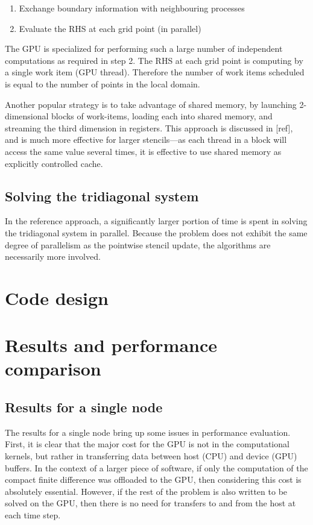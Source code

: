 \documentclass{article}
\begin{document}
        \begin{enumerate}
            \item Exchange boundary information with neighbouring processes
            \item Evaluate the RHS at each grid point (in parallel)
        \end{enumerate}

        The GPU is specialized for performing such a large number of independent
        computations as required in step 2.
        The RHS at each grid point is computing by a single work item
        (GPU thread).
        Therefore the number of work items scheduled is
        equal to the number of points in the local domain.

        Another popular strategy is to take advantage of
        shared memory, by launching 2-dimensional blocks of work-items,
        loading each into shared memory, and streaming the third dimension
        in registers.
        This approach is discussed in [ref], and is much more effective
        for larger stencils---as each thread in a block will access the same
        value several times, it is effective to use shared memory as explicitly
        controlled cache.

    \subsection{Solving the tridiagonal system}

        In the reference approach, a significantly larger portion of time is spent in solving
        the tridiagonal system in parallel.
        Because the problem does not exhibit the same degree of parallelism as
        the pointwise stencil update,
        the algorithms are necessarily more involved.

\section{Code design}

\section{Results and performance comparison}

    \subsection{Results for a single node}
    The results for a single node bring up some issues in performance evaluation.
    First, it is clear that the major cost for the GPU is not in the computational
    kernels, but rather in transferring data between host (CPU) and device (GPU) buffers.
    In the context of a larger piece of software,
    if only the computation of the compact finite difference was offloaded
    to the GPU, then considering this cost is absolutely essential.
    However, if the rest of the problem is also written to be solved on the GPU,
    then there is no need for transfers to and from the host at each
    time step.
\end{document}
